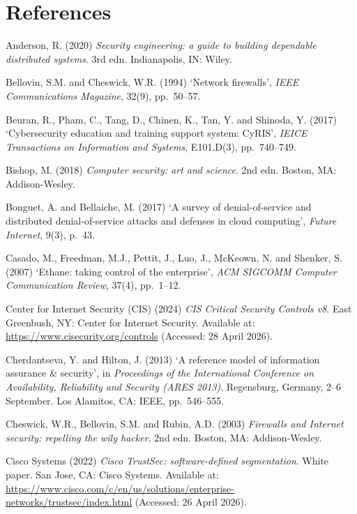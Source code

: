\chapter*{References}

\begingroup
\setlength{\parindent}{0pt}
\setlength{\parskip}{0.6em}
\raggedright

Anderson, R. (2020) \textit{Security engineering: a guide to building dependable distributed systems}. 3rd edn. Indianapolis, IN: Wiley.

Bellovin, S.M. and Cheswick, W.R. (1994) `Network firewalls', \textit{IEEE Communications Magazine}, 32(9), pp.~50--57.

Beuran, R., Pham, C., Tang, D., Chinen, K., Tan, Y. and Shinoda, Y. (2017) `Cybersecurity education and training support system: CyRIS', \textit{IEICE Transactions on Information and Systems}, E101.D(3), pp.~740--749.

Bishop, M. (2018) \textit{Computer security: art and science}. 2nd edn. Boston, MA: Addison-Wesley.

Bonguet, A. and Bellaiche, M. (2017) `A survey of denial-of-service and distributed denial-of-service attacks and defenses in cloud computing', \textit{Future Internet}, 9(3), p.~43.

Casado, M., Freedman, M.J., Pettit, J., Luo, J., McKeown, N. and Shenker, S. (2007) `Ethane: taking control of the enterprise', \textit{ACM SIGCOMM Computer Communication Review}, 37(4), pp.~1--12.

Center for Internet Security (CIS) (2024) \textit{CIS Critical Security Controls v8}. East Greenbush, NY: Center for Internet Security. Available at: \url{https://www.cisecurity.org/controls} (Accessed: 28 April 2026).

Cherdantseva, Y. and Hilton, J. (2013) `A reference model of information assurance \& security', in \textit{Proceedings of the International Conference on Availability, Reliability and Security (ARES 2013)}. Regensburg, Germany, 2--6 September. Los Alamitos, CA: IEEE, pp.~546--555.

Cheswick, W.R., Bellovin, S.M. and Rubin, A.D. (2003) \textit{Firewalls and Internet security: repelling the wily hacker}. 2nd edn. Boston, MA: Addison-Wesley.

Cisco Systems (2022) \textit{Cisco TrustSec: software-defined segmentation}. White paper. San Jose, CA: Cisco Systems. Available at: \url{https://www.cisco.com/c/en/us/solutions/enterprise-networks/trustsec/index.html} (Accessed: 26 April 2026).


